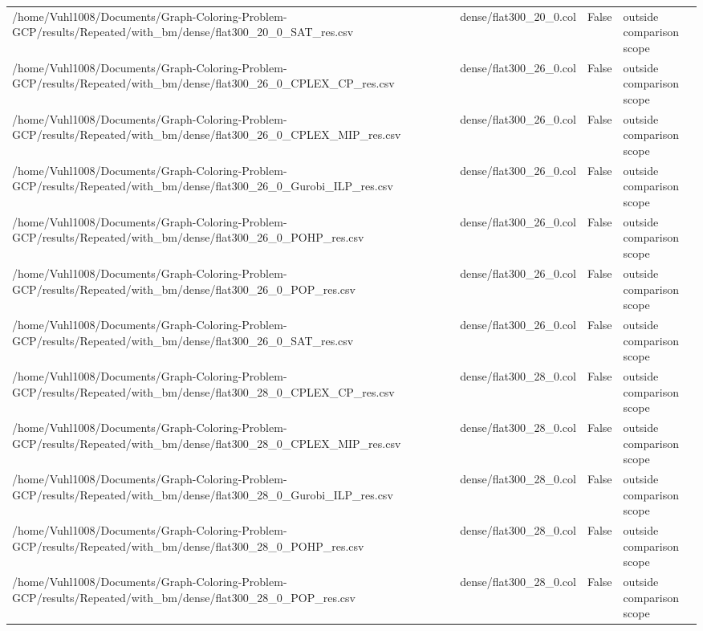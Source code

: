 \begin{table}[htbp]
\begin{tabular}{llll}
/home/Vuhl1008/Documents/Graph-Coloring-Problem-GCP/results/Repeated/with\_bm/dense/flat300\_20\_0\_SAT\_res.csv & dense/flat300\_20\_0.col & False & outside comparison scope \\
/home/Vuhl1008/Documents/Graph-Coloring-Problem-GCP/results/Repeated/with\_bm/dense/flat300\_26\_0\_CPLEX\_CP\_res.csv & dense/flat300\_26\_0.col & False & outside comparison scope \\
/home/Vuhl1008/Documents/Graph-Coloring-Problem-GCP/results/Repeated/with\_bm/dense/flat300\_26\_0\_CPLEX\_MIP\_res.csv & dense/flat300\_26\_0.col & False & outside comparison scope \\
/home/Vuhl1008/Documents/Graph-Coloring-Problem-GCP/results/Repeated/with\_bm/dense/flat300\_26\_0\_Gurobi\_ILP\_res.csv & dense/flat300\_26\_0.col & False & outside comparison scope \\
/home/Vuhl1008/Documents/Graph-Coloring-Problem-GCP/results/Repeated/with\_bm/dense/flat300\_26\_0\_POHP\_res.csv & dense/flat300\_26\_0.col & False & outside comparison scope \\
/home/Vuhl1008/Documents/Graph-Coloring-Problem-GCP/results/Repeated/with\_bm/dense/flat300\_26\_0\_POP\_res.csv & dense/flat300\_26\_0.col & False & outside comparison scope \\
/home/Vuhl1008/Documents/Graph-Coloring-Problem-GCP/results/Repeated/with\_bm/dense/flat300\_26\_0\_SAT\_res.csv & dense/flat300\_26\_0.col & False & outside comparison scope \\
/home/Vuhl1008/Documents/Graph-Coloring-Problem-GCP/results/Repeated/with\_bm/dense/flat300\_28\_0\_CPLEX\_CP\_res.csv & dense/flat300\_28\_0.col & False & outside comparison scope \\
/home/Vuhl1008/Documents/Graph-Coloring-Problem-GCP/results/Repeated/with\_bm/dense/flat300\_28\_0\_CPLEX\_MIP\_res.csv & dense/flat300\_28\_0.col & False & outside comparison scope \\
/home/Vuhl1008/Documents/Graph-Coloring-Problem-GCP/results/Repeated/with\_bm/dense/flat300\_28\_0\_Gurobi\_ILP\_res.csv & dense/flat300\_28\_0.col & False & outside comparison scope \\
/home/Vuhl1008/Documents/Graph-Coloring-Problem-GCP/results/Repeated/with\_bm/dense/flat300\_28\_0\_POHP\_res.csv & dense/flat300\_28\_0.col & False & outside comparison scope \\
/home/Vuhl1008/Documents/Graph-Coloring-Problem-GCP/results/Repeated/with\_bm/dense/flat300\_28\_0\_POP\_res.csv & dense/flat300\_28\_0.col & False & outside comparison scope \\

\end{tabular}
\end{table}
